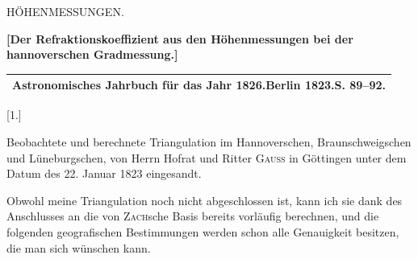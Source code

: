 

\clearpage\null\vspace*{5.7cm}
\begin{center}{\fontsize{24}{30}\selectfont HÖHENMESSUNGEN.}\end{center}
\par\vspace*{11.2cm}\noindent\makebox[.86\linewidth][r]{55\textsuperscript{*}}\par
\clearpage\null
\clearpage
\vspace*{1.5cm}
\begin{center}
{\large\textbf{[Der Refraktionskoeffizient aus den Höhenmessungen bei der hannoverschen Gradmessung.]}}\par\bigskip
\begin{tabular}{c}\hline
\textbf{Astronomisches Jahrbuch für das Jahr 1826.\quad Berlin 1823.\quad S. 89--92.}\\\hline
\end{tabular}\par\bigskip
{\large [1.]}\par\medskip
{\large Beobachtete und berechnete Triangulation im Hannoverschen, Braunschweigschen und Lüneburgschen, von Herrn Hofrat und Ritter \textsc{Gauss} in Göttingen unter dem Datum des 22. Januar 1823 eingesandt.}
\end{center}
\par\noindent\hspace*{\parindent}Obwohl meine Triangulation noch nicht abgeschlossen ist, kann ich sie dank des Anschlusses an die von \textsc{Zach}sche Basis bereits vorläufig berechnen, und die folgenden geografischen Bestimmungen werden schon alle Genauigkeit besitzen, die man sich wünschen kann.
